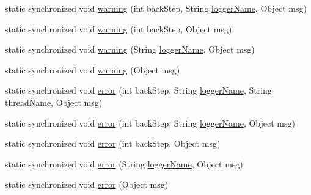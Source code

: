 \begin{DoxyCompactItemize}
\item 
static synchronized void \hyperlink{classit_1_1emarolab_1_1cagg_1_1debugging_1_1DebuggingText_1_1Logger_ae6911db7976157f4884cedfa1174561a}{warning} (int back\-Step, String \hyperlink{classit_1_1emarolab_1_1cagg_1_1debugging_1_1DebuggingText_afa1175bdb0c7a658affe0b25a8a924c3}{logger\-Name}, Object msg)
\item 
static synchronized void \hyperlink{classit_1_1emarolab_1_1cagg_1_1debugging_1_1DebuggingText_1_1Logger_a4ade7c68639fa76cad1fed8df2286f3d}{warning} (int back\-Step, Object msg)
\item 
static synchronized void \hyperlink{classit_1_1emarolab_1_1cagg_1_1debugging_1_1DebuggingText_1_1Logger_aed3335afa58831126c790ca75a80a9d3}{warning} (String \hyperlink{classit_1_1emarolab_1_1cagg_1_1debugging_1_1DebuggingText_afa1175bdb0c7a658affe0b25a8a924c3}{logger\-Name}, Object msg)
\item 
static synchronized void \hyperlink{classit_1_1emarolab_1_1cagg_1_1debugging_1_1DebuggingText_1_1Logger_a27731bc79c9945ee081621bd02993e61}{warning} (Object msg)
\item 
static synchronized void \hyperlink{classit_1_1emarolab_1_1cagg_1_1debugging_1_1DebuggingText_1_1Logger_a27e152723c2659a37c924a0eec0d4c1a}{error} (int back\-Step, String \hyperlink{classit_1_1emarolab_1_1cagg_1_1debugging_1_1DebuggingText_afa1175bdb0c7a658affe0b25a8a924c3}{logger\-Name}, String thread\-Name, Object msg)
\item 
static synchronized void \hyperlink{classit_1_1emarolab_1_1cagg_1_1debugging_1_1DebuggingText_1_1Logger_a85404d85cb39399cce51c7c2bcb4c7d3}{error} (int back\-Step, String \hyperlink{classit_1_1emarolab_1_1cagg_1_1debugging_1_1DebuggingText_afa1175bdb0c7a658affe0b25a8a924c3}{logger\-Name}, Object msg)
\item 
static synchronized void \hyperlink{classit_1_1emarolab_1_1cagg_1_1debugging_1_1DebuggingText_1_1Logger_a02a997f9620962cc45f8ccfce5e910ab}{error} (int back\-Step, Object msg)
\item 
static synchronized void \hyperlink{classit_1_1emarolab_1_1cagg_1_1debugging_1_1DebuggingText_1_1Logger_ac033a41326b62d3988152d2107adecda}{error} (String \hyperlink{classit_1_1emarolab_1_1cagg_1_1debugging_1_1DebuggingText_afa1175bdb0c7a658affe0b25a8a924c3}{logger\-Name}, Object msg)
\item 
static synchronized void \hyperlink{classit_1_1emarolab_1_1cagg_1_1debugging_1_1DebuggingText_1_1Logger_ae1d23af48f793edb1d6ccce184a2d0ab}{error} (Object msg)
\item 

\end{DoxyCompactItemize}
